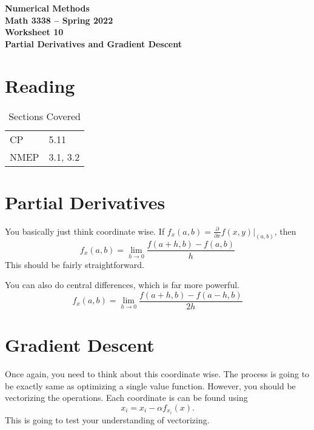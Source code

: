 \documentclass[11pt,letterpaper]{article}
\newcommand{\semester}{Spring 2022}
\begin{document}
\begin{center}
{\huge{\bf  Numerical Methods}} \\[1.5ex]
{\bf Math 3338 -- \semester}\\[1.5ex]
{\Large{\bf Worksheet 10\ \\[2ex] Partial Derivatives and Gradient Descent}}\\
\end{center}
\vspace{2mm}


\section{Reading}

\begin{table}[!ht]
 \centering
 \begin{tabular}{ll}
   CP &  5.11 \\
 NMEP & 3.1, 3.2
 \end{tabular}
\caption{Sections Covered}
\end{table}

\section{Partial Derivatives}
You basically just think coordinate wise. If $f_x(a,b) = \frac{\partial}{\partial x} f(x,y)\vert_{(a,b)}$, then 
\begin{equation*}
 f_x(a,b) = \lim_{h\rightarrow 0} \frac{f(a+h,b) - f(a,b)}{h}
\end{equation*}
This should be fairly straightforward. 

You can also do central differences, which is far more powerful.
\begin{equation*}
 f_x(a,b) = \lim_{h\rightarrow 0} \frac{f(a+h,b) - f(a-h,b)}{2h}
\end{equation*}


\section{Gradient Descent}
Once again, you need to think about this coordinate wise. The process is going to be exactly same as optimizing a single value function. However, you should be vectorizing the operations. Each coordinate is can be found using
\begin{equation*}
 x_i = x_i - \alpha f_{x_i}(x).
\end{equation*}
This is going to test your understanding of vectorizing. 
\end{document}
